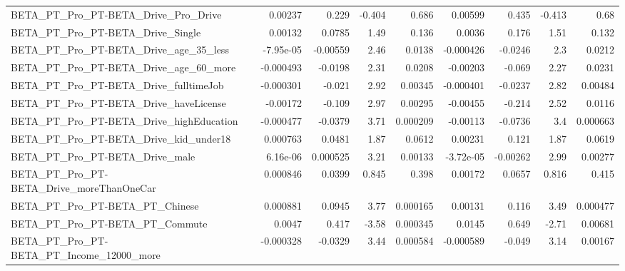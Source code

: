 \begin{tabular}{lrrrrrrrr}
BETA\_PT\_Pro\_PT-BETA\_Drive\_Pro\_Drive                &     0.00237 &        0.229 &   -0.404 &    0.686 &    0.00599 &       0.435 &       -0.413 &          0.68 \\
BETA\_PT\_Pro\_PT-BETA\_Drive\_Single                   &     0.00132 &       0.0785 &     1.49 &    0.136 &     0.0036 &       0.176 &         1.51 &         0.132 \\
BETA\_PT\_Pro\_PT-BETA\_Drive\_age\_35\_less              &   -7.95e-05 &     -0.00559 &     2.46 &   0.0138 &  -0.000426 &     -0.0246 &          2.3 &        0.0212 \\
BETA\_PT\_Pro\_PT-BETA\_Drive\_age\_60\_more              &   -0.000493 &      -0.0198 &     2.31 &   0.0208 &   -0.00203 &      -0.069 &         2.27 &        0.0231 \\
BETA\_PT\_Pro\_PT-BETA\_Drive\_fulltimeJob              &   -0.000301 &       -0.021 &     2.92 &  0.00345 &  -0.000401 &     -0.0237 &         2.82 &       0.00484 \\
BETA\_PT\_Pro\_PT-BETA\_Drive\_haveLicense              &    -0.00172 &       -0.109 &     2.97 &  0.00295 &   -0.00455 &      -0.214 &         2.52 &        0.0116 \\
BETA\_PT\_Pro\_PT-BETA\_Drive\_highEducation            &   -0.000477 &      -0.0379 &     3.71 & 0.000209 &   -0.00113 &     -0.0736 &          3.4 &      0.000663 \\
BETA\_PT\_Pro\_PT-BETA\_Drive\_kid\_under18              &    0.000763 &       0.0481 &     1.87 &   0.0612 &    0.00231 &       0.121 &         1.87 &        0.0619 \\
BETA\_PT\_Pro\_PT-BETA\_Drive\_male                     &    6.16e-06 &     0.000525 &     3.21 &  0.00133 &  -3.72e-05 &    -0.00262 &         2.99 &       0.00277 \\
BETA\_PT\_Pro\_PT-BETA\_Drive\_moreThanOneCar           &    0.000846 &       0.0399 &    0.845 &    0.398 &    0.00172 &      0.0657 &        0.816 &         0.415 \\
BETA\_PT\_Pro\_PT-BETA\_PT\_Chinese                     &    0.000881 &       0.0945 &     3.77 & 0.000165 &    0.00131 &       0.116 &         3.49 &      0.000477 \\
BETA\_PT\_Pro\_PT-BETA\_PT\_Commute                     &      0.0047 &        0.417 &    -3.58 & 0.000345 &     0.0145 &       0.649 &        -2.71 &       0.00681 \\
BETA\_PT\_Pro\_PT-BETA\_PT\_Income\_12000\_more           &   -0.000328 &      -0.0329 &     3.44 & 0.000584 &  -0.000589 &      -0.049 &         3.14 &       0.00167 \\

\end{tabular}
